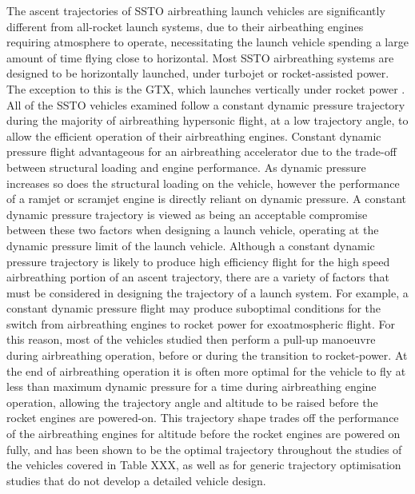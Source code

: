 The ascent trajectories of SSTO airbreathing launch vehicles are significantly different from all-rocket launch systems, due to their airbeathing engines requiring atmosphere to operate, necessitating the launch vehicle spending a large amount of time flying close to horizontal.
Most SSTO airbreathing systems are designed to be horizontally launched, under turbojet or rocket-assisted power. The exception to this is the GTX, which launches vertically under rocket power\cite{Roche2000,Trefny1999} . 
All of the SSTO vehicles examined follow a constant dynamic pressure trajectory during the majority of airbreathing hypersonic flight, at a low trajectory angle, to allow the efficient operation of their airbreathing engines. 
Constant dynamic pressure flight advantageous for an airbreathing accelerator due to the trade-off between structural loading and engine performance\cite{Olds1998}. As dynamic pressure increases so does the structural loading on the vehicle, however the performance of a ramjet or scramjet engine is directly reliant on dynamic pressure\cite{Olds1998}. A constant dynamic pressure trajectory is viewed as being an acceptable compromise between these two factors when designing a launch vehicle, operating at the dynamic pressure limit of the launch vehicle. 
Although a constant dynamic pressure trajectory is likely to produce high efficiency flight for the high speed airbreathing portion of an ascent trajectory, there are a variety of factors that must be considered in designing the trajectory of a launch system. 
For example, a constant dynamic pressure flight may produce suboptimal conditions for the switch from airbreathing engines to rocket power for exoatmospheric flight. For this reason, most of the vehicles studied then perform a pull-up manoeuvre during airbreathing operation, before or during the transition to rocket-power. 
At the end of airbreathing operation it is often more optimal for the vehicle to fly at less than maximum dynamic pressure for a time during airbreathing engine operation, allowing the trajectory angle and altitude to be raised before the rocket engines are powered-on. 
This trajectory shape trades off the performance of the airbreathing engines for altitude before the rocket engines are powered on fully, and has been shown to be the optimal trajectory throughout the studies of the vehicles covered in Table XXX\cite{Argus,Powell1991,Trefny1999,Roche2000,Pescetelli2012,Young2006,Bradford2000,Hyperion}, as well as for generic trajectory optimisation studies that do not develop a detailed vehicle design\cite{Pescetelli2012,Mooij,Lu1993}.
